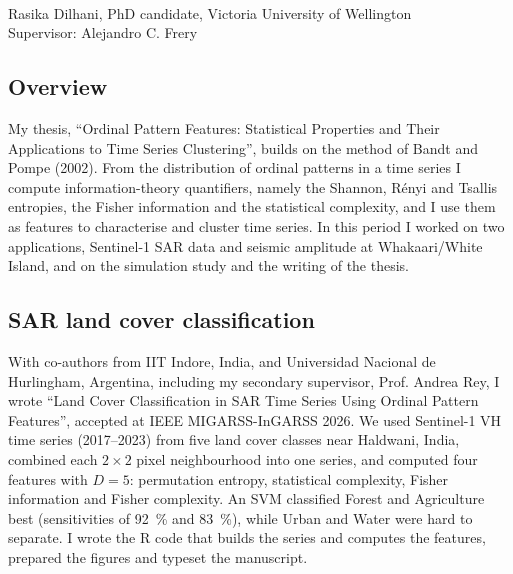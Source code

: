 \documentclass[11pt,a4paper]{article}
\begin{document}
	
\\[1ex]
Rasika Dilhani, PhD candidate, Victoria University of Wellington\\
Supervisor: Alejandro C. Frery
	
\subsection*{Overview}
My thesis, ``Ordinal Pattern Features: Statistical Properties and Their Applications to Time Series Clustering'', builds on the method of Bandt and Pompe (2002). From the distribution of ordinal patterns in a time series I compute information-theory quantifiers, namely the Shannon, Rényi and Tsallis entropies, the Fisher information and the statistical complexity, and I use them as features to characterise and cluster time series.
In this period I worked on two applications, Sentinel-1 SAR data and seismic amplitude at Whakaari/White Island, and on the simulation study and the writing of the thesis.
	
\subsection*{SAR land cover classification}
With co-authors from IIT Indore, India, and Universidad Nacional de Hurlingham, Argentina, including my secondary supervisor, Prof. Andrea Rey, I wrote ``Land Cover Classification in SAR Time Series Using Ordinal Pattern Features'', accepted at IEEE MIGARSS-InGARSS 2026. We used Sentinel-1 VH time series (2017--2023) from five land cover classes near Haldwani, India, combined each $2\times2$ pixel neighbourhood into one series, and computed four features with $D=5$: permutation entropy, statistical complexity, Fisher information and Fisher complexity.
An SVM classified Forest and Agriculture best (sensitivities of \SI{92}{\percent} and \SI{83}{\percent}), while Urban and Water were hard to separate.
I wrote the R code that builds the series and computes the features, prepared the figures and typeset the manuscript.

	
\end{document}
